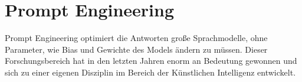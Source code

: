 





\section{Prompt Engineering}
Prompt Engineering optimiert die Antworten große Sprachmodelle, ohne Parameter, wie Bias und Gewichte des Models ändern zu müssen. Dieser Forschungsbereich hat in den letzten Jahren enorm an Bedeutung gewonnen und sich zu einer eigenen Disziplin im Bereich der Künstlichen Intelligenz entwickelt.\vspace{0.2cm}

